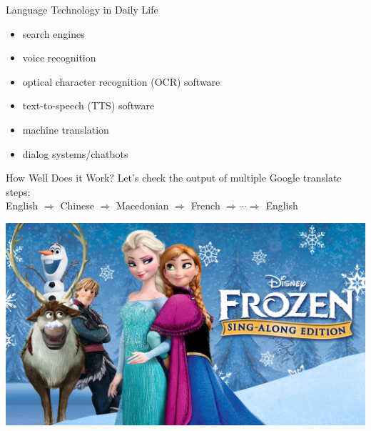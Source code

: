 \documentclass[xcolor={usenames,svgnames,x11names,dvipsnames,table}]{beamer}
\begin{document}
\begin{frame}{Language Technology in Daily Life}
    \begin{itemize}
        \item search engines\\
        \item voice recognition\\
        \item optical character recognition (OCR) software\\
        \item text-to-speech (TTS) software\\
        \item machine translation\\
        \item dialog systems\slash chatbots\\
    \end{itemize}
\end{frame}

\begin{frame}{How Well Does it Work?}
    Let's check the output of multiple Google translate steps:\\
    English $\Rightarrow$ Chinese $\Rightarrow$ Macedonian $\Rightarrow$ French $\Rightarrow \cdots \Rightarrow$ English

    \begin{center}
        \href{run:./frozen_parody.mp4}{
            \includegraphics[width=.75\linewidth]{img/frozen}}
    \end{center}
\end{frame}
\end{document}
